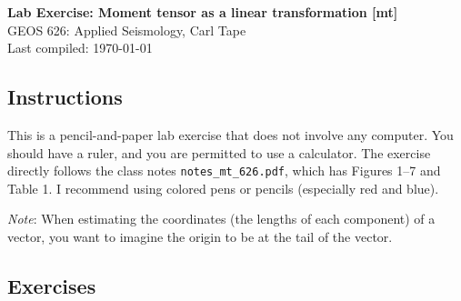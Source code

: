 \documentclass[11pt,titlepage,fleqn]{article}
\newcommand{\mtfile}{\texttt{notes\_mt\_626.pdf}}
\begin{document}

\begin{spacing}{1.2}
\centering
{\large \bf Lab Exercise: Moment tensor as a linear transformation [mt]} \\
GEOS 626: Applied Seismology, Carl Tape \\
Last compiled: \today
\end{spacing}


\subsection*{Instructions}

This is a pencil-and-paper lab exercise that does not involve any computer. You should have a ruler, and you are permitted to use a calculator. The exercise directly follows the class notes \mtfile, which has Figures 1--7 and Table 1. I recommend using colored pens or pencils (especially red and blue).

\medskip\noindent
{\em Note}: When estimating the coordinates (\ie the lengths of each component) of a vector, you want to imagine the origin to be at the tail of the vector. 


\subsection*{Exercises}
\end{document}
